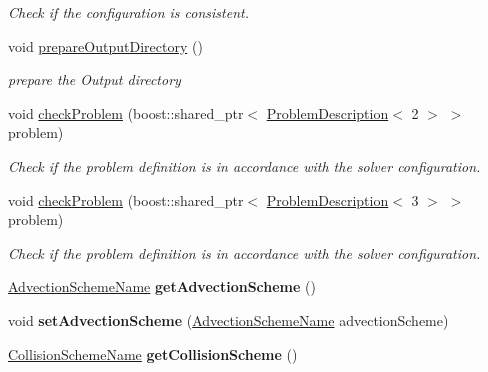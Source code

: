 \begin{DoxyCompactItemize}
\begin{DoxyCompactList}\small\item\em Check if the configuration is consistent. \item\end{DoxyCompactList}\item 
void \hyperlink{classnatrium_1_1SolverConfiguration_a69c009fd87690677b66ab10a000d07f6}{prepareOutputDirectory} ()
\begin{DoxyCompactList}\small\item\em prepare the Output directory \item\end{DoxyCompactList}\item 
void \hyperlink{classnatrium_1_1SolverConfiguration_acc8235baf17f3178be1baf6bd82b35a6}{checkProblem} (boost::shared\_\-ptr$<$ \hyperlink{classnatrium_1_1ProblemDescription}{ProblemDescription}$<$ 2 $>$ $>$ problem)
\begin{DoxyCompactList}\small\item\em Check if the problem definition is in accordance with the solver configuration. \item\end{DoxyCompactList}\item 
void \hyperlink{classnatrium_1_1SolverConfiguration_af841d7ee18a68938be3e207cc8e7f787}{checkProblem} (boost::shared\_\-ptr$<$ \hyperlink{classnatrium_1_1ProblemDescription}{ProblemDescription}$<$ 3 $>$ $>$ problem)
\begin{DoxyCompactList}\small\item\em Check if the problem definition is in accordance with the solver configuration. \item\end{DoxyCompactList}\item 
\hypertarget{classnatrium_1_1SolverConfiguration_aaf32180358f99d78d56b3435dff11a11}{
\hyperlink{namespacenatrium_ab73faf50bccace063cee6f66b5af2b02}{AdvectionSchemeName} {\bfseries getAdvectionScheme} ()}
\label{classnatrium_1_1SolverConfiguration_aaf32180358f99d78d56b3435dff11a11}

\item 
\hypertarget{classnatrium_1_1SolverConfiguration_a4fef165cd5a17247203af08846ec0f31}{
void {\bfseries setAdvectionScheme} (\hyperlink{namespacenatrium_ab73faf50bccace063cee6f66b5af2b02}{AdvectionSchemeName} advectionScheme)}
\label{classnatrium_1_1SolverConfiguration_a4fef165cd5a17247203af08846ec0f31}

\item 
\hypertarget{classnatrium_1_1SolverConfiguration_a90e61c6fa9387a1cbf5943674bf307a8}{
\hyperlink{namespacenatrium_a77a27ea835db291372b246db6b4b1578}{CollisionSchemeName} {\bfseries getCollisionScheme} ()}
\label{classnatrium_1_1SolverConfiguration_a90e61c6fa9387a1cbf5943674bf307a8}


\end{DoxyCompactItemize}
